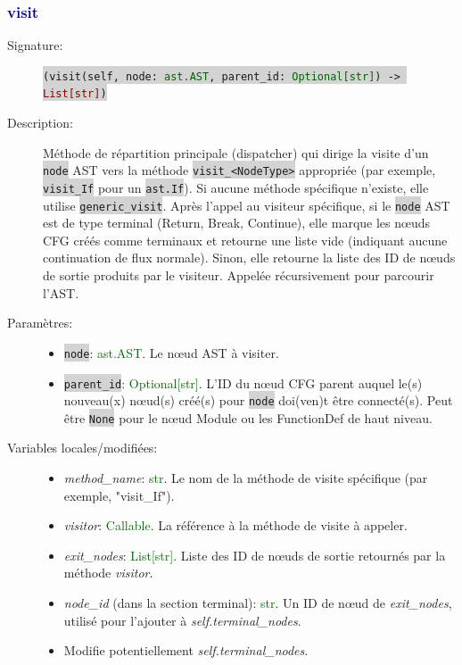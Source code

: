 \documentclass[11pt,a4paper]{article}
\newcommand{\code}[1]{\colorbox{lightgray}{\texttt{\small #1}}}
\newcommand{\var}[1]{\textit{#1}}
\newcommand{\vartype}[1]{\textcolor{darkgreen}{#1}}
\newcommand{\methodname}[1]{\textbf{\textcolor{darkblue}{#1}}}
\newcommand{\param}[1]{\code{#1}}
\newcommand{\rettype}[1]{\textcolor{darkred}{#1}}
\begin{document}
\subsubsection*{\methodname{visit}}
\begin{description}
    \item[Signature:] \code{(visit(self, node: \vartype{ast.AST}, parent\_id: \vartype{Optional[str]}) -> \rettype{List[str]})}
    \item[Description:] Méthode de répartition principale (dispatcher) qui dirige la visite d'un \param{node} AST vers la méthode \code{visit\_<NodeType>} appropriée (par exemple, \code{visit\_If} pour un \code{ast.If}). Si aucune méthode spécifique n'existe, elle utilise \code{generic\_visit}. Après l'appel au visiteur spécifique, si le \param{node} AST est de type terminal (Return, Break, Continue), elle marque les nœuds CFG créés comme terminaux et retourne une liste vide (indiquant aucune continuation de flux normale). Sinon, elle retourne la liste des ID de nœuds de sortie produits par le visiteur. Appelée récursivement pour parcourir l'AST.
    \item[Paramètres:]
    \begin{itemize}
        \item \param{node}: \vartype{ast.AST}. Le nœud AST à visiter.
        \item \param{parent\_id}: \vartype{Optional[str]}. L'ID du nœud CFG parent auquel le(s) nouveau(x) nœud(s) créé(s) pour \param{node} doi(ven)t être connecté(s). Peut être \code{None} pour le nœud Module ou les FunctionDef de haut niveau.
    \end{itemize}
    \item[Variables locales/modifiées:]
    \begin{itemize}
        \item \var{method\_name}: \vartype{str}. Le nom de la méthode de visite spécifique (par exemple, "visit\_If").
        \item \var{visitor}: \vartype{Callable}. La référence à la méthode de visite à appeler.
        \item \var{exit\_nodes}: \vartype{List[str]}. Liste des ID de nœuds de sortie retournés par la méthode \var{visitor}.
        \item \var{node\_id} (dans la section terminal): \vartype{str}. Un ID de nœud de \var{exit\_nodes}, utilisé pour l'ajouter à \var{self.terminal\_nodes}.
        \item Modifie potentiellement \var{self.terminal\_nodes}.
    \end{itemize}
\end{description}
\end{document}
